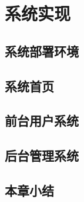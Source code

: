 \chapter{系统实现}


\section{系统部署环境}


\section{系统首页}

\section{前台用户系统}

\section{后台管理系统}

\section{本章小结}












